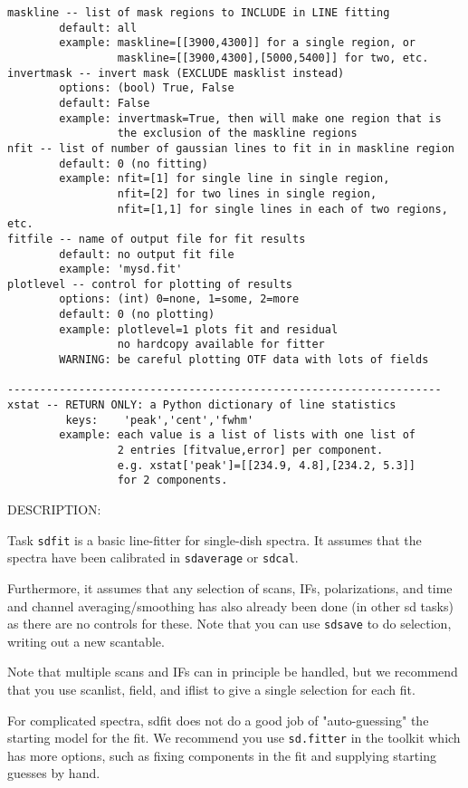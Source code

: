 \begin{verbatim}
maskline -- list of mask regions to INCLUDE in LINE fitting
        default: all
        example: maskline=[[3900,4300]] for a single region, or
                 maskline=[[3900,4300],[5000,5400]] for two, etc.
invertmask -- invert mask (EXCLUDE masklist instead)
        options: (bool) True, False
        default: False
        example: invertmask=True, then will make one region that is
                 the exclusion of the maskline regions
nfit -- list of number of gaussian lines to fit in in maskline region
        default: 0 (no fitting)
        example: nfit=[1] for single line in single region,
                 nfit=[2] for two lines in single region,
                 nfit=[1,1] for single lines in each of two regions, etc.
fitfile -- name of output file for fit results
        default: no output fit file
        example: 'mysd.fit'
plotlevel -- control for plotting of results
        options: (int) 0=none, 1=some, 2=more
        default: 0 (no plotting)
        example: plotlevel=1 plots fit and residual
                 no hardcopy available for fitter
        WARNING: be careful plotting OTF data with lots of fields

-------------------------------------------------------------------
xstat -- RETURN ONLY: a Python dictionary of line statistics
         keys:    'peak','cent','fwhm'
        example: each value is a list of lists with one list of
                 2 entries [fitvalue,error] per component.
                 e.g. xstat['peak']=[[234.9, 4.8],[234.2, 5.3]]
                 for 2 components.
\end{verbatim}

    DESCRIPTION:

    Task {\tt sdfit} is a basic line-fitter for single-dish spectra.
    It assumes that the spectra have been calibrated in {\tt sdaverage}
    or {\tt sdcal}.

    Furthermore, it assumes that any selection of scans, IFs,
    polarizations, and time and channel averaging/smoothing has
    also already been done (in other sd tasks) as there are no controls
    for these.  Note that you can use {\tt sdsave} to do selection, writing
    out a new scantable.

    Note that multiple scans and IFs can in principle be handled, but
    we recommend that you use scanlist, field, and iflist to give a
    single selection for each fit.

    For complicated spectra, sdfit does not do a good job of
    "auto-guessing" the starting model for the fit.  We recommend
    you use {\tt sd.fitter} in the toolkit which has more options, such
    as fixing components in the fit and supplying starting guesses
    by hand.

